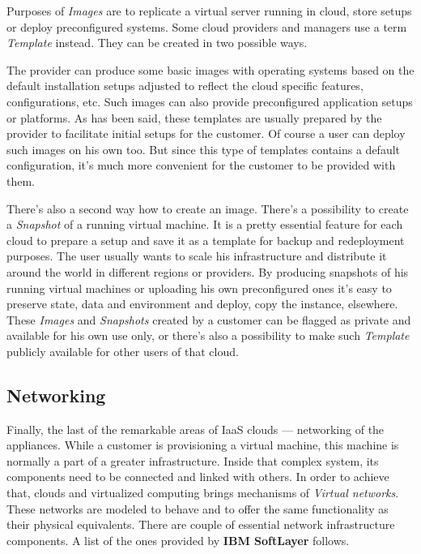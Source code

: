 Purposes of \emph{Images} are to replicate a virtual server running in cloud, store setups or deploy preconfigured systems. Some cloud providers and managers use a term \emph{Template} instead. They can be created in two possible ways.

The provider can produce some basic images with operating systems based on the default installation setups adjusted to reflect the cloud specific features, configurations, etc. Such images can also provide preconfigured application setups or platforms. As has been said, these templates are usually prepared by the provider to facilitate initial setups for the customer. Of course a user can deploy such images on his own too. But since this type of templates contains a default configuration, it's much more convenient for the customer to be provided  with them.

There's also a second way how to create an image. There's a possibility to create a \emph{Snapshot} of a running virtual machine. It is a pretty essential feature for each cloud to prepare a setup and save it as a template for backup and redeployment purposes. The user usually wants to scale his infrastructure and distribute it around the world in different regions or providers. By producing snapshots of his running virtual machines or uploading his own preconfigured ones it's easy to preserve state, data and environment and deploy, copy the instance, elsewhere. These \emph{Images} and \emph{Snapshots} created by a customer can be flagged as private and available for his own use only, or there's also a possibility to make such \emph{Template} publicly available for other users of that cloud.

\subsection{Networking}
\label{sub:Networking}

Finally, the last of the remarkable areas of IaaS clouds --- networking of the appliances. While a customer is provisioning a virtual machine, this machine is normally a part of a greater infrastructure. Inside that complex system, its components need to be connected and linked with others. In order to achieve that, clouds and virtualized computing brings mechanisms of \emph{Virtual networks}. These networks are modeled to behave and to offer the same functionality as their physical equivalents. There are couple of essential network infrastructure components. A list of the ones provided by \textbf{IBM SoftLayer} follows.

